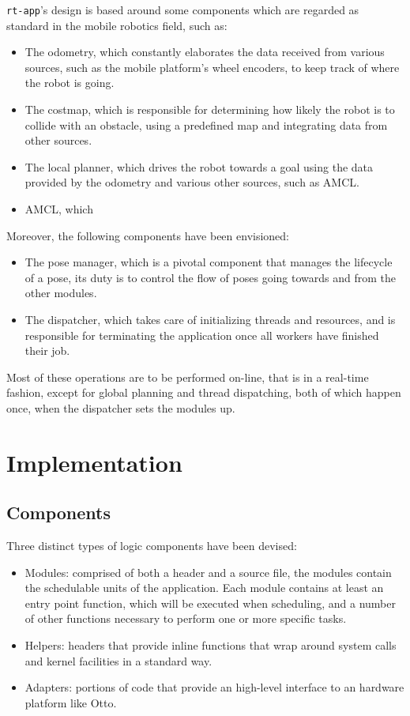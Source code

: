 \documentclass[a4paper,12pt]{report}
\begin{document}
\texttt{rt-app}'s design is based around some components which are regarded as standard in the mobile robotics field, such as:
\begin{itemize}
    \item The odometry, which constantly elaborates the data received from various sources, such as the mobile platform's wheel encoders, to keep track of where the robot is going.
    \item The costmap, which is responsible for determining how likely the robot is to collide with an obstacle, using a predefined map and integrating data from other sources.
    \item The local planner, which drives the robot towards a goal using the data provided by the odometry and various other sources, such as AMCL.
    \item AMCL, which
\end{itemize}

Moreover, the following components have been envisioned:
\begin{itemize}
  \item The pose manager, which is a pivotal component that manages the lifecycle of a pose, its duty is to control the flow of poses going towards and from the other modules.
  \item The dispatcher, which takes care of initializing threads and resources, and is responsible for terminating the application once all workers have finished their job.
\end{itemize}

Most of these operations are to be performed on-line, that is in a real-time fashion, except for global planning and thread dispatching, both of which happen once, when the dispatcher sets the modules up.

\section{Implementation}

\subsection{Components}

Three distinct types of logic components have been devised:
\begin{itemize}
    \item Modules: comprised of both a header and a source file, the modules contain the schedulable units of the application. Each module contains at least an entry point function, which will be executed when scheduling, and a number of other functions necessary to perform one or more specific tasks.   
    \item Helpers: headers that provide inline functions that wrap around system calls and kernel facilities in a standard way.
    \item Adapters: portions of code that provide an high-level interface to an hardware platform like Otto.
\end{itemize}
\end{document}
